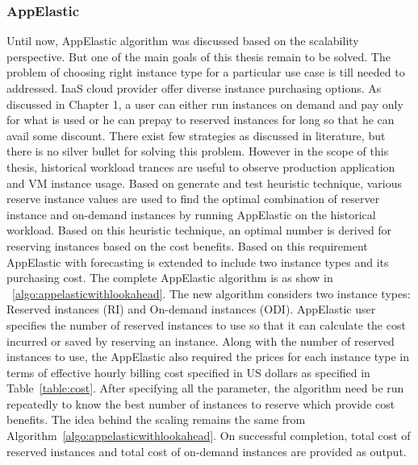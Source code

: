 \subsubsection{AppElastic}
\label{subs:AppElastic}
Until now, AppElastic algorithm was discussed based on the scalability perspective. But one of the main goals of this thesis remain to be solved. The problem of choosing right instance type for a particular use case is till needed to addressed.  IaaS cloud provider offer diverse instance purchasing options. As discussed in Chapter 1, a user can either run instances on demand and pay only for what is used or he can prepay to reserved instances for long so that he can avail some discount. There  exist few strategies as discussed in literature\cite{wang2013reserve}, but there is no silver bullet for solving this problem. However in the scope of this thesis, historical workload trances are useful to observe production application and VM instance usage. Based on generate and test heuristic technique, various reserve instance values are used to find the optimal combination of reserver instance and on-demand instances by running AppElastic on the historical workload. Based on this heuristic technique, an optimal number is derived for reserving instances based on the cost benefits. Based on this requirement AppElastic with forecasting is extended to include two instance types and its purchasing cost. The complete AppElastic algorithm is as show in ~\ref{algo:appelasticwithlookahead}. The new algorithm considers two instance types: Reserved instances (RI) and On-demand instances (ODI). AppElastic user specifies the number of reserved instances to use so that it can calculate the cost incurred or saved by reserving an instance. Along with the number of reserved instances to use, the AppElastic also required the prices for each instance type in terms of effective hourly billing cost specified in US dollars as specified in Table~\ref{table:cost}. After specifying all the parameter, the algorithm need be run repeatedly to know the best number of instances to reserve which provide cost benefits. The idea behind the scaling remains the same from Algorithm~\ref{algo:appelasticwithlookahead}. On successful completion, total cost of reserved instances and total cost of on-demand instances are provided as output.
\LinesNumbered
